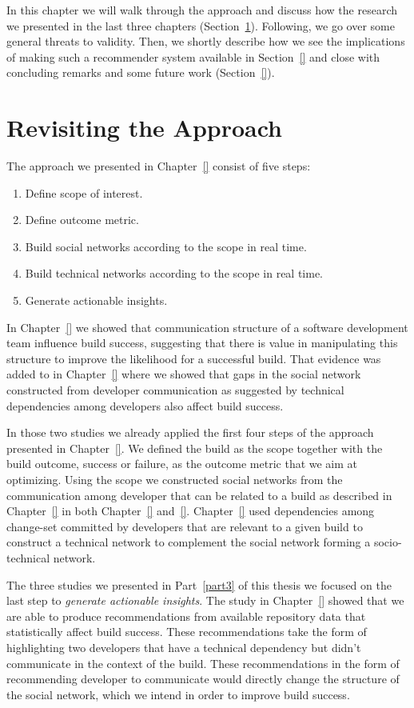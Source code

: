 \label{chap:disc}
In this chapter we will walk through the approach and discuss how the research we presented in the last three chapters (Section~\ref{ch:dis:app}).
Following, we go over some general threats to validity.
Then, we shortly describe how we see the implications of making such a recommender system available in Section~\ref{} and close with concluding remarks and some future work (Section~\ref{}).

\section{Revisiting the Approach}
\label{ch:dis:app}
The approach we presented in Chapter~\ref{} consist of five steps:

\begin{enumerate}
\item Define scope of interest.
\item Define outcome metric.
\item Build social networks according to the scope in real time.
\item Build technical networks according to the scope in real time.
\item Generate actionable insights.
\end{enumerate}

In Chapter~\ref{} we showed that communication structure of a software development team influence build success, suggesting that there is value in manipulating this structure to improve the likelihood for a successful build.
That evidence was added to in Chapter~\ref{} where we showed that gaps in the social network constructed from developer communication as suggested by technical dependencies among developers also affect build success.

In those two studies we already applied the first four steps of the approach presented in Chapter~\ref{}.
We defined the build as the scope together with the build outcome, success or failure, as the outcome metric that we aim at optimizing.
Using the scope we constructed social networks from the communication among developer that can be related to a build as described in Chapter~\ref{} in both Chapter~\ref{} and~\ref{}.
Chapter~\ref{} used dependencies among change-set committed by developers that are relevant to a given build to construct a technical network to complement the social network forming a socio-technical network.

The three studies we presented in Part~\ref{part3} of this thesis we  focused on the last step to \emph{generate actionable insights}.
The study in Chapter~\ref{} showed that we are able to produce recommendations from available repository data that statistically affect build success.
These recommendations take the form of highlighting two developers that have a technical dependency but didn't communicate in the context of the build.
These recommendations in the form of recommending developer to communicate would directly change the structure of the social network, which we intend in order to improve build success.

